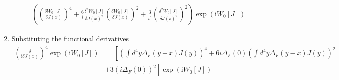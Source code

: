 \documentclass[10pt,a4paper]{book}
\theoremstyle{definition}
\begin{document}
\begin{enumerate}
\begin{align*}
    &=\left(\left(\frac{\delta W_0[J]}{\delta J(x)}\right)^4+\frac{6}{i}\frac{\delta^2 W_0[J]}{\delta J(x)^2}\left(\frac{\delta W_0[J]}{\delta J(x)}\right)^2+\frac{3}{i^2}\left(\frac{\delta^2 W_0[J]}{\delta J(x)^2}\right)^2\right)\exp\left(\text{i}W_0[J]\right)
\end{align*}
\item Substituting the functional derivatives
\begin{align*}    
     \left(\frac{\delta}{\text{i}\delta J(x)}\right)^4\exp\left(\text{i}W_0[J]\right)&=\left[\left(\int d^4y\Delta_F(y-x)J(y)\right)^4+6i\Delta_F(0)\left(\int d^4y\Delta_F(y-x)J(y)\right)^2\right.\\
     &\left.+3\left(i\Delta_F(0)\right)^2\right]\exp\left(\text{i}W_0[J]\right)\\
\end{align*}
\end{enumerate}
\end{document}
